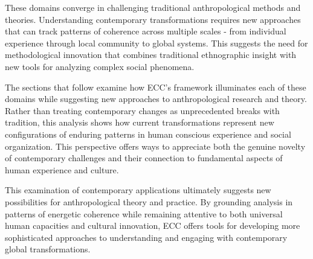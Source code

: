 These domains converge in challenging traditional anthropological methods and theories. Understanding contemporary transformations requires new approaches that can track patterns of coherence across multiple scales - from individual experience through local community to global systems. This suggests the need for methodological innovation that combines traditional ethnographic insight with new tools for analyzing complex social phenomena.

The sections that follow examine how ECC's framework illuminates each of these domains while suggesting new approaches to anthropological research and theory. Rather than treating contemporary changes as unprecedented breaks with tradition, this analysis shows how current transformations represent new configurations of enduring patterns in human conscious experience and social organization. This perspective offers ways to appreciate both the genuine novelty of contemporary challenges and their connection to fundamental aspects of human experience and culture.

This examination of contemporary applications ultimately suggests new possibilities for anthropological theory and practice. By grounding analysis in patterns of energetic coherence while remaining attentive to both universal human capacities and cultural innovation, ECC offers tools for developing more sophisticated approaches to understanding and engaging with contemporary global transformations.








